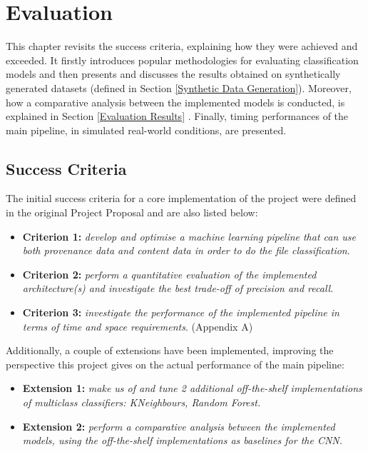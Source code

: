 

\chapter{Evaluation}

This chapter revisits the success criteria, explaining how they were achieved and exceeded. It firstly introduces popular methodologies for evaluating classification models and then presents and discusses the results obtained on synthetically generated datasets (defined in Section \ref{Synthetic Data Generation}). Moreover, how a comparative analysis between the implemented models is conducted, is explained in Section \ref{Evaluation Results} . Finally, timing performances of the main pipeline, in simulated real-world conditions, are presented. 

\section{Success Criteria}

The initial success criteria for a core implementation of the project were defined in the original Project Proposal and are also listed below:

\begin{itemize}
  \item \textbf{Criterion 1:} \textit{develop and optimise a machine learning pipeline that can use both provenance data and content data in order to do the file classification}. \greencheck

  \item \textbf{Criterion 2:} \textit{perform a quantitative evaluation of the implemented architecture(s) and investigate the best trade-off of precision and recall}. \greencheck

  \item \textbf{Criterion 3:} \textit{investigate the performance of the implemented pipeline in terms of time and space requirements}. (Appendix A) \greencheck

\end{itemize}

Additionally, a couple of extensions have been implemented, improving the perspective this project gives on the actual performance of the main pipeline:

\begin{itemize}
  \item \textbf{Extension 1:} \textit{make us of and tune 2 additional off-the-shelf implementations of multiclass classifiers: KNeighbours, Random Forest.} \greencheck

  \item \textbf{Extension 2:} \textit{perform a comparative analysis between the implemented models, using the off-the-shelf implementations as baselines for the CNN.} \greencheck

\end{itemize}


